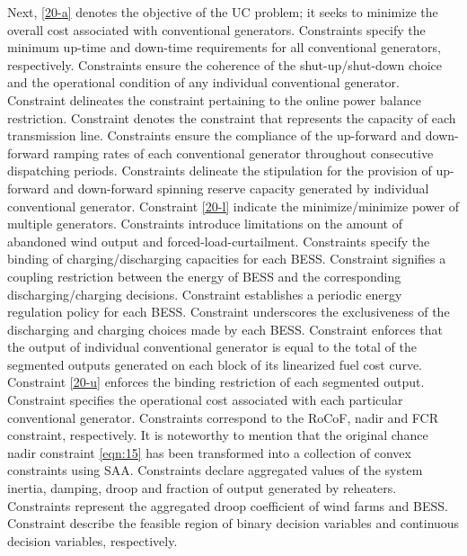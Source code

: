 \documentclass[lettersize,journal]{IEEEtran}
\begin{document}
Next, \cref{20-a} denotes the objective of the UC problem; it seeks to minimize the overall cost associated with conventional generators. Constraints  specify the minimum up-time and down-time requirements for all conventional generators, respectively. Constraints  ensure the coherence of the shut-up/shut-down choice and the operational condition of any individual conventional generator. Constraint  delineates the constraint pertaining to the online power balance restriction. Constraint  denotes the constraint that represents the capacity of each transmission line. Constraints  ensure the compliance of the up-forward and down-forward ramping rates of each conventional generator throughout consecutive dispatching periods. Constraints  delineate the stipulation for the provision of up-forward and down-forward spinning reserve capacity generated by individual conventional generator. Constraint \eqref{20-l} indicate the minimize/minimize power of multiple generators. Constraints  introduce limitations on the amount of abandoned wind output and forced-load-curtailment. Constraints  specify the binding of charging/discharging capacities for each BESS. Constraint  signifies a coupling restriction between the energy of BESS and the corresponding discharging/charging decisions. Constraint  establishes a periodic energy regulation policy for each BESS. Constraint  underscores the exclusiveness of the discharging and charging choices made by each BESS.
Constraint  enforces that the output of individual conventional generator is equal to the total of the segmented outputs generated on each block of its linearized fuel cost curve. Constraint \eqref{20-u} enforces the binding restriction of each segmented output. Constraint  specifies the operational cost associated with each particular conventional generator. Constraints  correspond to the RoCoF, nadir and FCR constraint, respectively. It is noteworthy to mention that the original chance nadir constraint \eqref{eqn:15} has been transformed into a collection of convex constraints using SAA. Constraints  declare aggregated values of the system inertia, damping, droop and fraction of output generated by reheaters. Constraints  represent the aggregated droop coefficient of wind farms and BESS. Constraint  describe the feasible region of binary decision variables and continuous decision variables, respectively.
\end{document}
